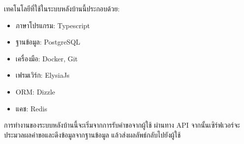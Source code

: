 เทคโนโลยีที่ใช้ในระบบหลังบ้านนี้ประกอบด้วย:
\begin{itemize}
    \item ภาษาโปรแกรม: Typescript
    \item ฐานข้อมูล: PostgreSQL
    \item เครื่องมือ: Docker, Git
    \item เฟรมเวิร์ก: ElysiaJs
    \item ORM: Dizzle
    \item แคช: Redis
\end{itemize}

การทำงานของระบบหลังบ้านนี้จะเริ่มจากการรับคำขอจากผู้ใช้ ผ่านทาง API จากนั้นเซิร์ฟเวอร์จะประมวลผลคำขอและดึงข้อมูลจากฐานข้อมูล แล้วส่งผลลัพธ์กลับไปยังผู้ใช้
\fi